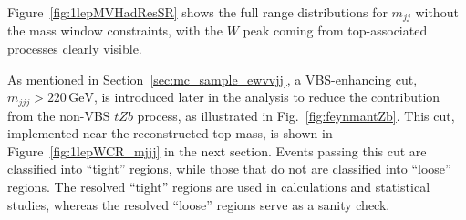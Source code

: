 Figure~\ref{fig:1lepMVHadResSR} shows the full range distributions for $m_{jj}$ without the mass window constraints, with the $W$ peak coming from top-associated processes clearly visible.

As mentioned in Section~\ref{sec:mc_sample_ewvvjj}, a VBS-enhancing cut, $m_{jjj} > 220\,\si{\GeV}$, is introduced later in the analysis to reduce the contribution from the non-VBS $tZb$ process, as illustrated in Fig.~\ref{fig:feynmantZb}. This cut, implemented near the reconstructed top mass, is shown in Figure~\ref{fig:1lepWCR_mjjj} in the next section. Events passing this cut are classified into ``tight'' regions, while those that do not are classified into ``loose'' regions. The resolved ``tight'' regions are used in calculations and statistical studies, whereas the resolved ``loose'' regions serve as a sanity check.

